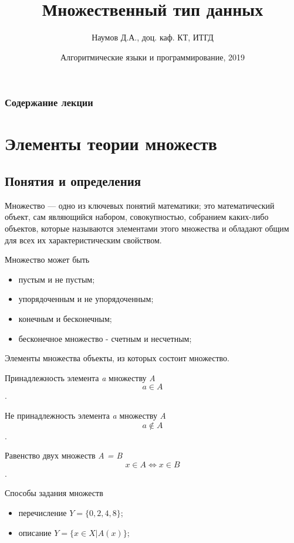 \documentclass{beamer}
\title[Массивы]{Множественный тип данных}
\author{Наумов Д.А., доц. каф. КТ, ИТГД }
\date[12.12.2019] {Алгоритмические языки и программирование, 2019}
\begin{document}
\begin{frame}
  \titlepage
\end{frame}
  
\begin{frame}
  \frametitle{Содержание лекции}
  \tableofcontents  
\end{frame}
  
\section{Элементы теории множеств}
\subsection{Понятия и определения}
\begin{frame}
Множество — одно из ключевых понятий математики; это математический объект, сам являющийся набором, совокупностью, собранием каких-либо объектов, которые называются элементами этого множества и обладают общим для всех их характеристическим свойством.
\begin{block}{Множество может быть}
\begin{itemize}
\item пустым и не пустым;
\item упорядоченным и не упорядоченным;
\item конечным и бесконечным;
\item бесконечное множество - счетным и несчетным;
\end{itemize}
\end{block}
\begin{block}{Элементы множества}
объекты, из которых состоит множество.
\end{block}
\end{frame} 

\begin{frame}
\begin{block}{Принадлежность элемента \textit{a} множеству \textit{A}}
\[a \in A\].
\end{block}
\begin{block}{Не принадлежность элемента \textit{a} множеству \textit{A}}
\[a \notin A\].
\end{block}
\begin{block}{Равенство двух множеств \textit{A = B}}
\[x \in A \Longleftrightarrow x \in B\].
\end{block}
\begin{block}{Способы задания множеств}
\begin{itemize}
\item перечисление $Y = \{0, 2, 4, 8\}$;
\item описание $ Y = \{x \in X | A(x)\} $;
\end{itemize}
\end{block}
\end{frame} 
\end{document}
